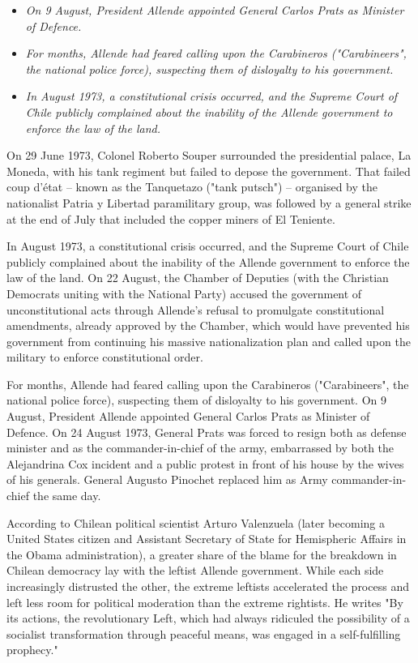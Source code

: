 \begin{itemize}
\item
  \emph{On 9 August, President Allende appointed General Carlos Prats as
  Minister of Defence.}
\item
  \emph{For months, Allende had feared calling upon the Carabineros
  ("Carabineers", the national police force), suspecting them of
  disloyalty to his government.}
\item
  \emph{In August 1973, a constitutional crisis occurred, and the
  Supreme Court of Chile publicly complained about the inability of the
  Allende government to enforce the law of the land.}
\end{itemize}

On 29 June 1973, Colonel Roberto Souper surrounded the presidential
palace, La Moneda, with his tank regiment but failed to depose the
government. That failed coup d'état -- known as the Tanquetazo ("tank
putsch") -- organised by the nationalist Patria y Libertad paramilitary
group, was followed by a general strike at the end of July that included
the copper miners of El Teniente.

In August 1973, a constitutional crisis occurred, and the Supreme Court
of Chile publicly complained about the inability of the Allende
government to enforce the law of the land. On 22 August, the Chamber of
Deputies (with the Christian Democrats uniting with the National Party)
accused the government of unconstitutional acts through Allende's
refusal to promulgate constitutional amendments, already approved by the
Chamber, which would have prevented his government from continuing his
massive nationalization plan and called upon the military to enforce
constitutional order.

For months, Allende had feared calling upon the Carabineros
("Carabineers", the national police force), suspecting them of
disloyalty to his government. On 9 August, President Allende appointed
General Carlos Prats as Minister of Defence. On 24 August 1973, General
Prats was forced to resign both as defense minister and as the
commander-in-chief of the army, embarrassed by both the Alejandrina Cox
incident and a public protest in front of his house by the wives of his
generals. General Augusto Pinochet replaced him as Army
commander-in-chief the same day.

According to Chilean political scientist Arturo Valenzuela (later
becoming a United States citizen and Assistant Secretary of State for
Hemispheric Affairs in the Obama administration), a greater share of the
blame for the breakdown in Chilean democracy lay with the leftist
Allende government. While each side increasingly distrusted the other,
the extreme leftists accelerated the process and left less room for
political moderation than the extreme rightists. He writes "By its
actions, the revolutionary Left, which had always ridiculed the
possibility of a socialist transformation through peaceful means, was
engaged in a self-fulfilling prophecy."

